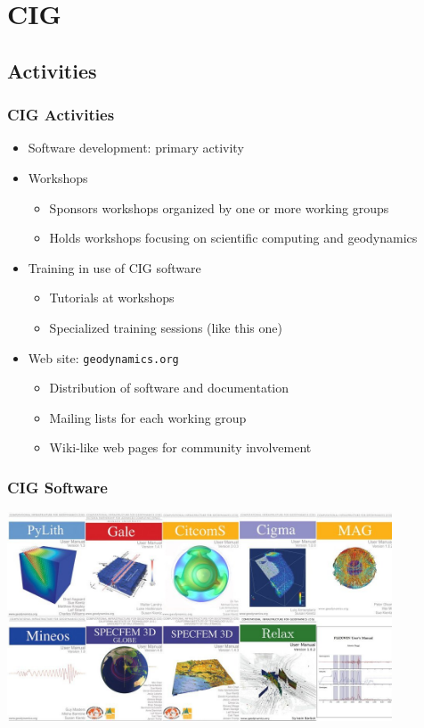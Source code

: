 \documentclass{beamer}
\begin{document}
\section{CIG}
\subsection{Activities}

\begin{frame}
  \frametitle{CIG Activities}
  \summary{}

  \begin{itemize}
  \item Software development: primary activity
  \item Workshops
    \begin{itemize}
    \item Sponsors workshops organized by one or more working groups
    \item Holds workshops focusing on scientific computing and geodynamics
    \end{itemize}
  \item Training in use of CIG software
    \begin{itemize}
    \item Tutorials at workshops
    \item Specialized training sessions (like this one)
    \end{itemize}
  \item Web site: {\tt geodynamics.org}
    \begin{itemize}
    \item Distribution of software and documentation
    \item Mailing lists for each working group
    \item Wiki-like web pages for community involvement
    \end{itemize}
  \end{itemize}
 
\end{frame}


\begin{frame}
  \frametitle{CIG Software}
  \summary{}

  \vfill
  \begin{center}
    \includegraphics[width=4.5in]{figs/covers}
  \end{center}
  \vfill

\end{frame}
\end{document}
